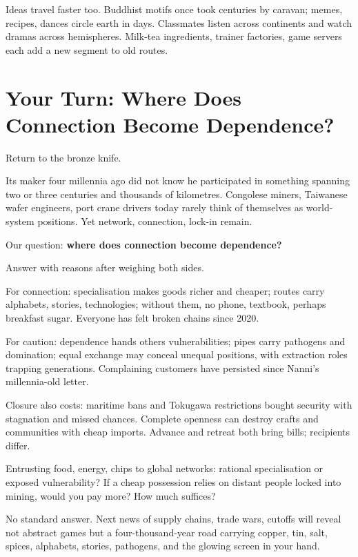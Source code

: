 Ideas travel faster too. Buddhist motifs once took centuries by caravan; memes, recipes, dances circle earth in days. Classmates listen across continents and watch dramas across hemispheres. Milk-tea ingredients, trainer factories, game servers each add a new segment to old routes.

\section[Your Turn: Connection or Dependence?]{Your Turn: Where Does Connection Become Dependence?}
Return to the bronze knife.

Its maker four millennia ago did not know he participated in something spanning two or three centuries and thousands of kilometres. Congolese miners, Taiwanese wafer engineers, port crane drivers today rarely think of themselves as world-system positions. Yet network, connection, lock-in remain.

Our question: \textbf{where does connection become dependence?}

Answer with reasons after weighing both sides.

For connection: specialisation makes goods richer and cheaper; routes carry alphabets, stories, technologies; without them, no phone, textbook, perhaps breakfast sugar. Everyone has felt broken chains since 2020.

For caution: dependence hands others vulnerabilities; pipes carry pathogens and domination; equal exchange may conceal unequal positions, with extraction roles trapping generations. Complaining customers have persisted since Nanni's millennia-old letter.

Closure also costs: maritime bans and Tokugawa restrictions bought security with stagnation and missed chances. Complete openness can destroy crafts and communities with cheap imports. Advance and retreat both bring bills; recipients differ.

Entrusting food, energy, chips to global networks: rational specialisation or exposed vulnerability? If a cheap possession relies on distant people locked into mining, would you pay more? How much suffices?

No standard answer. Next news of supply chains, trade wars, cutoffs will reveal not abstract games but a four-thousand-year road carrying copper, tin, salt, spices, alphabets, stories, pathogens, and the glowing screen in your hand.
